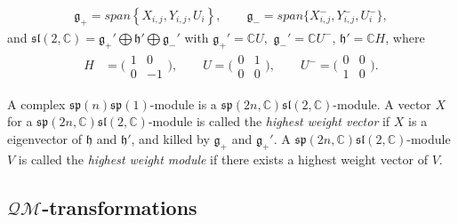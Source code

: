 \documentclass[a4paper,11pt]{amsart}
\numberwithin{equation}{section}
\begin{document}
\begin{equation}\begin{aligned}
\mathfrak{g}_{+}=span\left\{X_{i,j},Y_{i,j},U_i\right\},\qquad\mathfrak{g}_{-}=span\{X^{-}_{i,j},Y^{-}_{i,j},U^{-}_i\},
\end{aligned}\end{equation}
and $\mathfrak{sl}(2,\mathbb{C})=\mathfrak{g}_{+}'\bigoplus \mathfrak{h}'\bigoplus \mathfrak{g}_{-}'$ with $\mathfrak{g}_{+}'=\mathbb{C}U,$ $\mathfrak{g}_{-}'=\mathbb{C}U^{-}$, $\mathfrak{h}'=\mathbb{C}H$, where
\begin{equation}\begin{aligned}\label{sp1 basis}
H&=\bigg(\begin{matrix}1 &0\\0&-1\end{matrix}\bigg),\qquad U=\bigg(\begin{matrix}0&1\\0&0\end{matrix}\bigg),\qquad U^{-}=\bigg(\begin{matrix}0&0\\1&0\end{matrix}\bigg).
\end{aligned}\end{equation}

  A complex $\mathfrak{sp}(n)\mathfrak{sp}(1)$-module is a $\mathfrak{sp}(2n,\mathbb{C})\mathfrak{sl}(2,\mathbb{C})$-module.
A vector $X$ for a $\mathfrak{sp}(2n,\mathbb{C})\mathfrak{sl}(2,\mathbb{C})$-module is called the {\it highest weight vector} if $X$ is a eigenvector of $\mathfrak{h}$ and $\mathfrak{h}'$, and killed by $\mathfrak{g}_{+}$ and $\mathfrak{g}_{+}'$. A $\mathfrak{sp}(2n,\mathbb{C})\mathfrak{sl}(2,\mathbb{C})$-module $V$ is called the {\it highest weight module} if there exists a highest weight vector of $V$.



\subsection{$\mathcal{QM}$-transformations}
\end{document}
